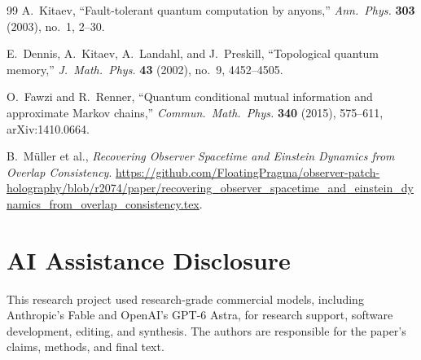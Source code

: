 \documentclass[11pt]{article}
\theoremstyle{remark}
\theoremstyle{plain}
\begin{document}
\begin{thebibliography}{99}
A.~Kitaev,
``Fault-tolerant quantum computation by anyons,''
\emph{Ann.\ Phys.} \textbf{303} (2003), no.~1, 2--30.

E.~Dennis, A.~Kitaev, A.~Landahl, and J.~Preskill,
``Topological quantum memory,''
\emph{J.\ Math.\ Phys.} \textbf{43} (2002), no.~9, 4452--4505.

O.~Fawzi and R.~Renner,
``Quantum conditional mutual information and approximate Markov chains,''
\emph{Commun.\ Math.\ Phys.} \textbf{340} (2015), 575--611,
arXiv:1410.0664.

B.~M\"uller et al.,
\emph{Recovering Observer Spacetime and Einstein Dynamics from Overlap Consistency}.
\url{https://github.com/FloatingPragma/observer-patch-holography/blob/r2074/paper/recovering_observer_spacetime_and_einstein_dynamics_from_overlap_consistency.tex}.

\end{thebibliography}

\section*{AI Assistance Disclosure}
This research project used research-grade commercial models, including
Anthropic's Fable and OpenAI's GPT-6 Astra, for research support, software
development, editing, and synthesis. The authors are responsible for the
paper's claims, methods, and final text.
\end{document}
